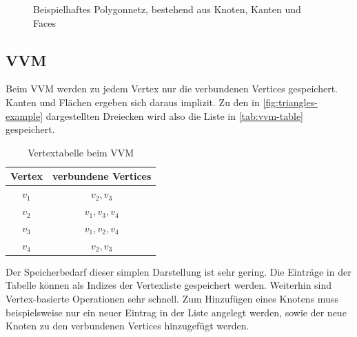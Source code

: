 \begin{figure}[ht]
\centering
{}
\caption{Beispielhaftes Polygonnetz, bestehend aus Knoten, Kanten und Faces}
\label{fig:triangles-example}
\end{figure}

\subsection{\acl{VVM}}
\label{subsec:v-v-mesh}

Beim \ac{VVM} werden zu jedem Vertex nur die verbundenen Vertices gespeichert.
Kanten und Flächen ergeben sich daraus implizit.
Zu den in \autoref{fig:triangles-example} dargestellten Dreiecken wird also die Liste in \autoref{tab:vvm-table} gespeichert.

\begin{table}[ht]
\centering
\begin{tabular}{| c | c |}
	\hline
	Vertex & verbundene Vertices\\
	\hline
	$v_1$ & $v_2, v_3$\\
	$v_2$ & $v_1, v_3, v_4$\\
	$v_3$ & $v_1, v_2, v_4$\\
	$v_4$ & $v_2, v_3$\\
	\hline
\end{tabular}
\caption{Vertextabelle beim \ac{VVM}}
\label{tab:vvm-table}
\end{table}

Der Speicherbedarf dieser simplen Darstellung ist sehr gering.
Die Einträge in der Tabelle können als Indizes der Vertexliste gespeichert werden.
Weiterhin sind Vertex-basierte Operationen sehr schnell.
Zum Hinzufügen eines Knotens muss beispielsweise nur ein neuer Eintrag in der Liste angelegt werden, sowie der neue Knoten zu den verbundenen Vertices hinzugefügt werden.

